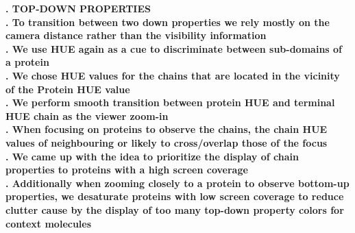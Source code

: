 \documentclass[review,journal]{vgtc}         %
\begin{document}


\textbf{. TOP-DOWN PROPERTIES} \\

\textbf{. To transition between two down properties we rely mostly on the camera distance rather than the visibility information} \\

\textbf{. We use HUE again as a cue to discriminate between sub-domains of a protein} \\

\textbf{. We chose HUE values for the chains that are located in the vicinity of the Protein HUE value} \\

\textbf{. We perform smooth transition between protein HUE and terminal HUE chain as the viewer zoom-in} \\

\textbf{. When focusing on proteins to observe the chains, the chain HUE values of neighbouring or likely to cross/overlap those of the focus} \\

\textbf{. We came up with the idea to prioritize the display of chain properties to proteins with a high screen coverage} \\

\textbf{. Additionally when zooming closely to a protein to observe bottom-up properties, we desaturate proteins with low screen coverage to reduce clutter cause by the display of too many top-down property colors for context molecules } \\ 
\end{document}
